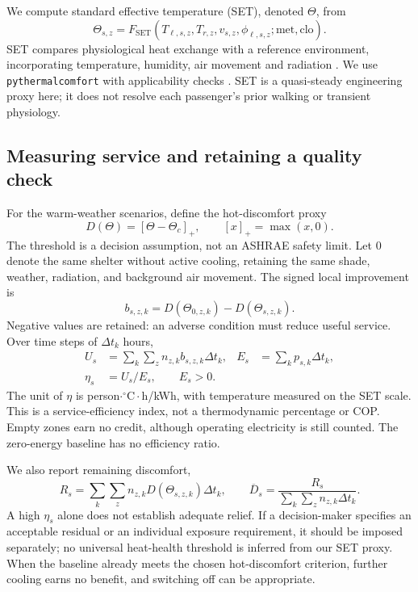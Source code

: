 \documentclass[12pt]{article}
\begin{document}
We compute standard effective temperature (SET), denoted $\Theta$, from
\begin{equation}
 \Theta_{s,z}=F_{\mathrm{SET}}(T_{\ell,s,z},T_{r,z},v_{s,z},\phi_{\ell,s,z};\mathrm{met},\mathrm{clo}).
\label{eq:set}
\end{equation}
SET compares physiological heat exchange with a reference environment, incorporating temperature, humidity, air movement and radiation \cite{thermalcomfort,fanguide}. We use \texttt{pythermalcomfort} with applicability checks \cite{pythermal}. SET is a quasi-steady engineering proxy here; it does not resolve each passenger's prior walking or transient physiology.

\subsection{Measuring service and retaining a quality check}

For the warm-weather scenarios, define the hot-discomfort proxy
\begin{equation}
 D(\Theta)=[\Theta-\Theta_c]_+,\qquad [x]_+=\max(x,0).
\end{equation}
The threshold is a decision assumption, not an ASHRAE safety limit. Let $0$ denote the same shelter without active cooling, retaining the same shade, weather, radiation, and background air movement. The signed local improvement is
\begin{equation}
 b_{s,z,k}=D(\Theta_{0,z,k})-D(\Theta_{s,z,k}).
\end{equation}
Negative values are retained: an adverse condition must reduce useful service. Over time steps of $\Delta t_k$ hours,
\begin{align}
 U_s&=\sum_k\sum_z n_{z,k}b_{s,z,k}\Delta t_k, &
 E_s&=\sum_k p_{s,k}\Delta t_k,\\
 \eta_s&=U_s/E_s,\qquad E_s>0.
\label{eq:bus-efficiency}
\end{align}
The unit of $\eta$ is person$\cdot{}^{\circ}\mathrm C\cdot$h/kWh, with temperature measured on the SET scale. This is a service-efficiency index, not a thermodynamic percentage or COP. Empty zones earn no credit, although operating electricity is still counted. The zero-energy baseline has no efficiency ratio.

We also report remaining discomfort,
\begin{equation}
 R_s=\sum_k\sum_z n_{z,k}D(\Theta_{s,z,k})\Delta t_k,
 \qquad \overline D_s=\frac{R_s}{\sum_k\sum_z n_{z,k}\Delta t_k}.
\label{eq:remaining}
\end{equation}
A high $\eta_s$ alone does not establish adequate relief. If a decision-maker specifies an acceptable residual or an individual exposure requirement, it should be imposed separately; no universal heat-health threshold is inferred from our SET proxy. When the baseline already meets the chosen hot-discomfort criterion, further cooling earns no benefit, and switching off can be appropriate.
\end{document}

